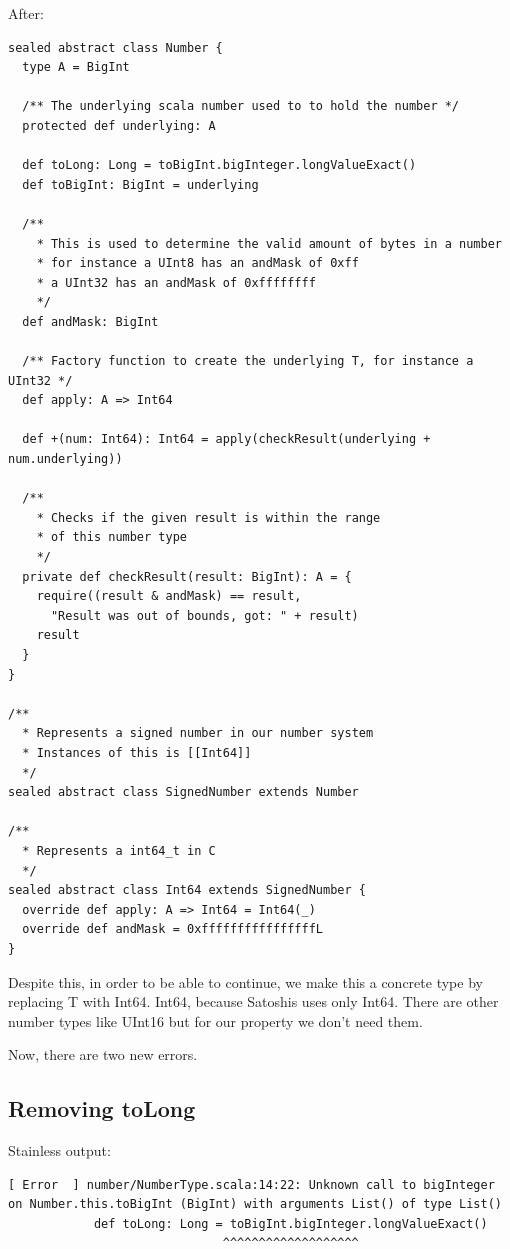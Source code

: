 \documentclass[runningheads]{llncs}
\begin{document}
After:
\begin{lstlisting}[style=scala]
sealed abstract class Number {
  type A = BigInt

  /** The underlying scala number used to to hold the number */
  protected def underlying: A

  def toLong: Long = toBigInt.bigInteger.longValueExact()
  def toBigInt: BigInt = underlying

  /**
    * This is used to determine the valid amount of bytes in a number
    * for instance a UInt8 has an andMask of 0xff
    * a UInt32 has an andMask of 0xffffffff
    */
  def andMask: BigInt

  /** Factory function to create the underlying T, for instance a UInt32 */
  def apply: A => Int64

  def +(num: Int64): Int64 = apply(checkResult(underlying + num.underlying))

  /**
    * Checks if the given result is within the range
    * of this number type
    */
  private def checkResult(result: BigInt): A = {
    require((result & andMask) == result,
      "Result was out of bounds, got: " + result)
    result
  }
}

/**
  * Represents a signed number in our number system
  * Instances of this is [[Int64]]
  */
sealed abstract class SignedNumber extends Number

/**
  * Represents a int64_t in C
  */
sealed abstract class Int64 extends SignedNumber {
  override def apply: A => Int64 = Int64(_)
  override def andMask = 0xffffffffffffffffL
}
\end{lstlisting}

Despite this, in order to be able to continue, we make this a concrete type by replacing T with Int64.
Int64,  because Satoshis uses only Int64.
There are other number types like UInt16 but for our property we don't need them.

Now, there are two new errors.


\subsection{Removing toLong}

Stainless output:
\begin{lstlisting}[style=stainless]
[ Error  ] number/NumberType.scala:14:22: Unknown call to bigInteger on Number.this.toBigInt (BigInt) with arguments List() of type List()
            def toLong: Long = toBigInt.bigInteger.longValueExact()
                              ^^^^^^^^^^^^^^^^^^^
\end{lstlisting}
\end{document}
